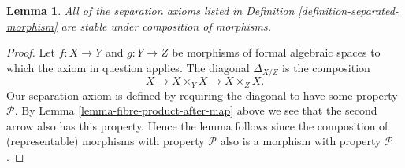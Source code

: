 \documentclass{stacks-project}
\theoremstyle{plain}
\newtheorem{lemma}[subsection]{Lemma}
\theoremstyle{definition}
\theoremstyle{remark}
\numberwithin{equation}{subsection}
\begin{document}
\begin{lemma}
\label{lemma-composition-separated}
All of the separation axioms listed in
Definition \ref{definition-separated-morphism}
are stable under composition of morphisms.
\end{lemma}

\begin{proof}
Let $f : X \to Y$ and $g : Y \to Z$ be morphisms of formal algebraic spaces
to which the axiom in question applies.
The diagonal $\Delta_{X/Z}$ is the composition
$$
X \longrightarrow X \times_Y X \longrightarrow X \times_Z X.
$$
Our separation axiom is defined by requiring the diagonal
to have some property $\mathcal{P}$. By
Lemma \ref{lemma-fibre-product-after-map} above we see that
the second arrow also has this property. Hence the lemma follows
since the composition of (representable) morphisms with property
$\mathcal{P}$ also is a morphism with property $\mathcal{P}$.
\end{proof}
\end{document}
